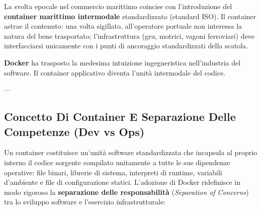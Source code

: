 \documentclass[11pt, a4paper]{article}
\begin{document}

La svolta epocale nel commercio marittimo coincise con l'introduzione del \textbf{container marittimo intermodale} standardizzato (standard ISO). Il container astrae il contenuto: una volta sigillato, all'operatore portuale non interessa la natura del bene trasportato; l'infrastruttura (gru, motrici, vagoni ferroviari) deve interfacciarsi unicamente con i punti di ancoraggio standardizzati della scatola.


\textbf{Docker} ha trasposto la medesima intuizione ingegneristica nell'industria del software. Il container applicativo diventa l'unità intermodale del codice.


---

\subsection{Concetto Di Container E Separazione Delle Competenze (Dev vs Ops)}

Un container costituisce un'unità software standardizzata che incapsula al proprio interno il codice sorgente compilato unitamente a tutte le sue dipendenze operative: file binari, librerie di sistema, interpreti di runtime, variabili d'ambiente e file di configurazione statici.
L'adozione di Docker ridefinisce in modo rigoroso la \textbf{separazione delle responsabilità} (\emph{Separation of Concerns}) tra lo sviluppo software e l'esercizio infrastrutturale:

\end{document}
